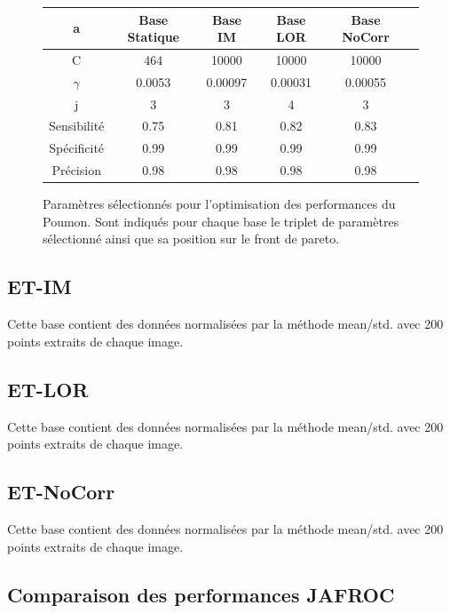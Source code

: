 \begin{figure}[h!]
\label{fig:paramsModPoumon}
		\begin{tabular}{c| c c c c c}
  \hline
  a	& Base Statique	& Base IM	& Base LOR	& Base NoCorr	\\
  \hline
 C 	& 464		& 10000		& 10000		& 10000		\\
\hline
$\gamma$& 0.0053	& 0.00097	& 0.00031	& 0.00055	\\
\hline
j	& 3		& 3		& 4		& 3		\\
\hline
\hline
Sensibilité& 0.75	& 0.81		& 0.82		& 0.83	\\
\hline
Spécificité& 0.99	& 0.99		& 0.99		& 0.99		\\
\hline
Précision& 0.98		& 0.98		& 0.98		& 0.98		\\
\hline
 		\end{tabular}

\caption{Paramètres sélectionnés pour l'optimisation des performances du Poumon. Sont indiqués pour chaque base le triplet de paramètres sélectionné ainsi que sa position sur le front de pareto.}
\end{figure}



\subsection{ET-IM}

Cette base contient des données normalisées par la méthode mean/std. avec 200 points extraits de chaque image.




\subsection{ET-LOR}

Cette base contient des données normalisées par la méthode mean/std. avec 200 points extraits de chaque image.


\subsection{ET-NoCorr}

Cette base contient des données normalisées par la méthode mean/std. avec 200 points extraits de chaque image.


\subsection{Comparaison des performances JAFROC}

